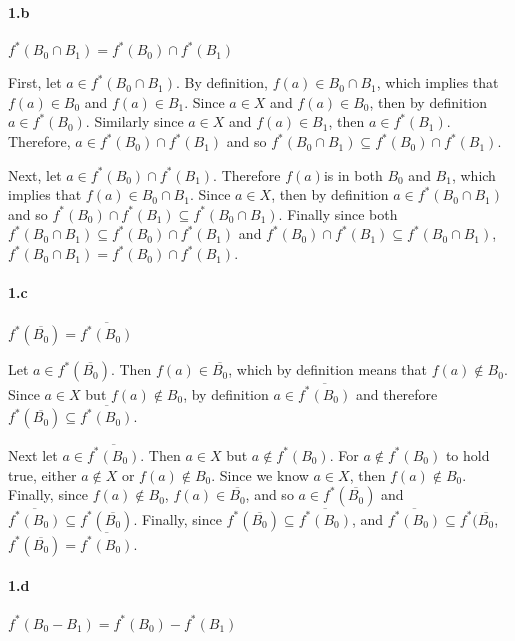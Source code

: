\documentclass[12pt, letterpaper]{article}
\begin{document}
\paragraph{1.b}\(f^*(B_0 \cap B_1) = f^*(B_0) \cap f^*(B_1)\)

First, let \(a \in f^*(B_0 \cap B_1)\). By definition, \(f(a) \in B_0 \cap B_1\), which implies that \(f(a) \in B_0\) and \(f(a) \in B_1\). Since \(a \in X\) and \(f(a) \in B_0\), then by definition \(a \in f^*(B_0)\). Similarly since \(a \in X\) and \(f(a) \in B_1\), then \(a \in f^*(B_1)\). Therefore, \(a \in f^*(B_0) \cap f^*(B_1)\) and so \(f^*(B_0 \cap B_1) \subseteq f^*(B_0) \cap f^*(B_1)\).

Next, let \(a \in f^*(B_0) \cap f^*(B_1)\). Therefore \(f(a)\)is in both \(B_0\) and \(B_1\), which implies that \(f(a) \in B_0 \cap B_1\). Since \(a \in X\), then by definition \(a \in  f^*(B_0 \cap B_1)\) and so  \(f^*(B_0) \cap f^*(B_1) \subseteq f^*(B_0 \cap B_1) \). Finally since both \(f^*(B_0 \cap B_1) \subseteq f^*(B_0) \cap f^*(B_1)\) and \(f^*(B_0) \cap f^*(B_1) \subseteq f^*(B_0 \cap B_1) \), \(f^*(B_0 \cap B_1) = f^*(B_0) \cap f^*(B_1)\).

\paragraph{1.c} \(f^*(\overline{B_0}) = \overline{f^*(B_0)}\) 

Let \( a \in f^*(\overline{B_0})\). Then \(f(a) \in \overline{B_0}\), which by definition means that \(f(a) \notin B_0\). Since \(a \in X\) but \(f(a) \notin B_0\), by definition 
 \(a \in \overline{f^*(B_0)}\) 
 and therefore \(f^*(\overline{B_0}) \subseteq \overline{f^*(B_0)}\).
 
Next let \(a \in  \overline{f^*(B_0)}\). Then \(a \in X\) but \(a \notin f^*(B_0)\). For \(a \notin f^*(B_0)\) to hold true, either  \(a \notin X\) or \(f(a) \notin B_0\). Since we know \(a \in X\), then \(f(a) \notin B_0\). Finally, since \(f(a) \notin B_0\), \(f(a) \in  \overline{B_0}\), and so 
 \( a \in f^*(\overline{B_0})\) 
 and \( \overline{f^*(B_0)} \subseteq f^*(\overline{B_0})\).
Finally, since \(f^*(\overline{B_0}) \subseteq \overline{f^*(B_0)}\),
 and
 \( \overline{f^*(B_0)} \subseteq f^*(\overline{B_0}\), 
 \(f^*(\overline{B_0}) = \overline{f^*(B_0)}\).
 
 \paragraph{1.d} \(f^*(B_0 - B_1) = f^*(B_0) - f^*(B_1)\)
 
\end{document}
